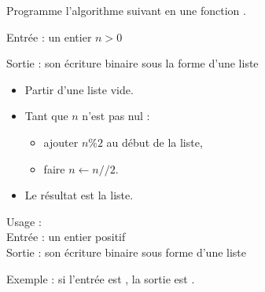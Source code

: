 \documentclass[11pt,class=report,crop=false]{standalone}
\begin{document}
  Programme l'algorithme suivant en une fonction .

  \begin{algorithme}
  Entrée : un entier $n>0$

  Sortie : son écriture binaire sous la forme d'une liste

  \begin{itemize}
    \item Partir d'une liste vide.
    
    \item Tant que $n$ n'est pas nul :
    
     \begin{itemize} 
       \item ajouter $n \% 2$ au début de la liste,
       \item faire $n \leftarrow n//2$.
     \end{itemize}    
         
    \item Le résultat est la liste.
  \end{itemize} 
             
 \end{algorithme}
 
   \begin{fonction}
  Usage :  \\
  Entrée : un entier positif \\
  Sortie : son écriture binaire sous forme d'une liste
  
  \medskip  
  Exemple : si l'entrée est , la sortie est \ci{[1,1,0,0,1,1,0,0]}.
  \end{fonction} 
  
\end{document}
